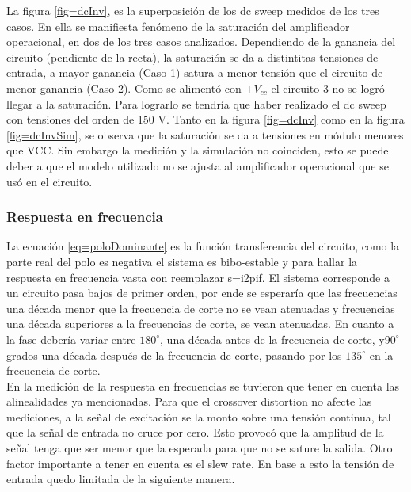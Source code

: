 \documentclass[../../main.tex]{subfiles}
\begin{document}
La figura \ref{fig=dcInv}, es la superposición de los dc sweep medidos de los tres casos. En ella se manifiesta fenómeno de la saturación del amplificador operacional, en dos de los tres casos analizados. Dependiendo de la ganancia del circuito (pendiente de la recta), la saturación se da a distintitas tensiones de entrada, a mayor ganancia (Caso 1) satura a menor tensión que el circuito de menor ganancia (Caso 2). Como se alimentó con $\pm V_{cc}$ el circuito 3 no se logró llegar a la saturación. Para lograrlo se tendría que haber realizado el dc sweep con tensiones del orden de 150 V.
Tanto en la figura \ref{fig=dcInv} como en la figura \ref{fig=dcInvSim},  se observa que la saturación se da a tensiones en módulo menores que VCC. Sin embargo la medición y la simulación no coinciden, esto se puede deber a que el modelo utilizado no se ajusta al amplificador operacional que se usó en el circuito.

\subsubsection{Respuesta en frecuencia}

La ecuación \ref{eq=poloDominante} es la función transferencia del circuito, como la parte real del polo es negativa el sistema es bibo-estable y para hallar la respuesta en frecuencia vasta con reemplazar s=i2pif. El sistema corresponde a un circuito pasa bajos de primer orden, por ende se esperaría que las frecuencias una década menor que la frecuencia de corte no se vean atenuadas y frecuencias una década superiores a la frecuencias de corte, se vean atenuadas. En cuanto a la fase debería variar entre $180^{\circ}$, una década antes de la frecuencia de corte, y$90^{\circ}$ grados una década después de la frecuencia de corte, pasando por los $135^{\circ}$ en la frecuencia de corte.
\\
En la medición de la respuesta en frecuencias se tuvieron que tener en cuenta las alinealidades ya mencionadas. Para que el crossover distortion no afecte las mediciones, a la señal de excitación se la monto sobre una tensión continua, tal que la señal de entrada no cruce por cero. Esto provocó que la amplitud de la señal tenga que ser menor que la esperada para que no se sature la salida. Otro factor importante a tener en cuenta es el slew rate. En base a esto la tensión de entrada quedo limitada de la siguiente manera.
\end{document}
